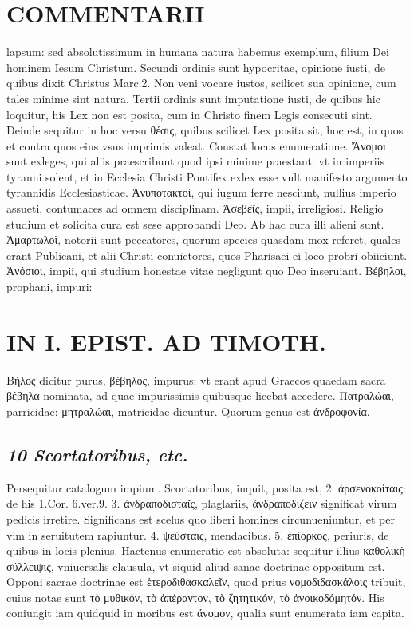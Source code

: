 \documentclass{article}
\begin{document}
\begin{pages}
\section*{COMMENTARII }
\marginpar{[ p.28 ]}\pstart lapsum: sed absolutissimum in humana natura habemus exemplum, filium Dei hominem Iesum Christum. Secundi ordinis sunt hypocritae, opinione iusti, de quibus dixit Christus Marc.2. Non veni vocare iustos, scilicet sua opinione, cum tales minime sint natura. Tertii ordinis sunt imputatione iusti, de quibus hic loquitur, his Lex non est posita, cum in Christo finem Legis consecuti sint.  \pend\pstart Deinde sequitur in hoc versu θέσις, quibus scilicet Lex posita sit, hoc est, in quos et contra quos eius vsus imprimis valeat. Constat locus enumeratione. Ἄνομοι sunt exleges, qui aliis praescribunt quod ipsi minime praestant: vt in imperiis tyranni solent, et in Ecclesia Christi Pontifex exlex esse vult manifesto argumento tyrannidis Ecclesiasticae.  \pend\pstart Ἀνυποτακτοὶ, qui iugum ferre nesciunt, nullius imperio assueti, contumaces ad omnem disciplinam.  \pend\pstart Ἀσεβεῖς, impii, irreligiosi. Religio studium et solicita cura est sese approbandi Deo. Ab hac cura illi alieni sunt.  \pend\pstart Ἁμαρτωλοὶ, notorii sunt peccatores, quorum species quasdam mox referet, quales erant Publicani, et alii Christi conuictores, quos Pharisaei ei loco probri obiiciunt. Ἀνόσιοι, impii, qui studium honestae vitae negligunt quo Deo inseruiant. Βέβηλοι, prophani, impuri:  \pend
\section*{IN I. EPIST. AD TIMOTH. }
\marginpar{[ p.29 ]}\pstart Βήλος dicitur purus, βέβηλος, impurus: vt erant apud Graecos quaedam sacra βέβηλα nominata, ad quae impurissimis quibusque licebat accedere. Πατραλώαι, parricidae: μητραλώαι, matricidae dicuntur. Quorum genus est ἀνδροφονία.  \pend
{}
{}
\subsection*{\textit{10 Scortatoribus, etc. }}\pstart Persequitur catalogum impium. Scortatoribus, inquit, posita est, 2. ἀρσενοκοίταις: de his 1.Cor. 6.ver.9. 3. ἀνδραποδισταῖς, plaglariis, ἀνδραποδίζειν significat virum pedicis irretire. Significans est scelus quo liberi homines circunueniuntur, et per vim in seruitutem rapiuntur. 4. ψεύσταις, mendacibus. 5. ἐπίορκος, periuris, de quibus in locis plenius. Hactenus enumeratio est absoluta: sequitur illius καθολικὴ σύλλειψις, vniuersalis clausula, vt siquid aliud sanae doctrinae oppositum est. Opponi sacrae doctrinae est ἑτεροδιθασκαλεῖν, quod prius νομοδιδασκάλοις tribuit, cuius notae sunt τὸ μυθικόν, τὸ ἀπέραντον, τὸ  ζητητικόν, τὸ ἀνοικοδόμητόν. His coniungit iam quidquid in moribus est ἄνομον, qualia sunt enumerata iam capita.  \pend
{}
{}

\end{pages}
\end{document}
